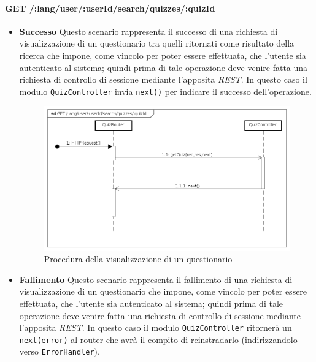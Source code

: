 \paragraph{GET /:lang/user/:userId/search/quizzes/:quizId}
\begin{itemize}
\item \textbf{Successo}
Questo scenario rappresenta il successo di una richiesta di visualizzazione di un questionario tra quelli ritornati come risultato della ricerca che impone, come vincolo per poter essere effettuata, che l'utente sia autenticato al sistema; quindi prima di tale operazione deve venire fatta una richiesta di controllo di sessione mediante l'apposita \textit{REST}. In questo caso il modulo \texttt{QuizController} invia \texttt{next()} per indicare il successo dell'operazione.

\begin{figure}[ht]
	\centering
	\includegraphics[scale=0.45]{UML/DiagrammiDiSequenza/Back-end/GET__lang_user__userId_search_quizzes__quizId_success.png}
	\caption{Procedura della visualizzazione di un questionario}
\end{figure}
\FloatBarrier

\item \textbf{Fallimento}
Questo scenario rappresenta il fallimento di una richiesta di visualizzazione di un questionario che impone, come vincolo per poter essere effettuata, che l'utente sia autenticato al sistema; quindi prima di tale operazione deve venire fatta una richiesta di controllo di sessione mediante l'apposita \textit{REST}. In questo caso il modulo \texttt{QuizController} ritornerà un \texttt{next(error)} al router che avrà il compito di reinstradarlo (indirizzandolo verso \texttt{ErrorHandler}).


\end{itemize}
